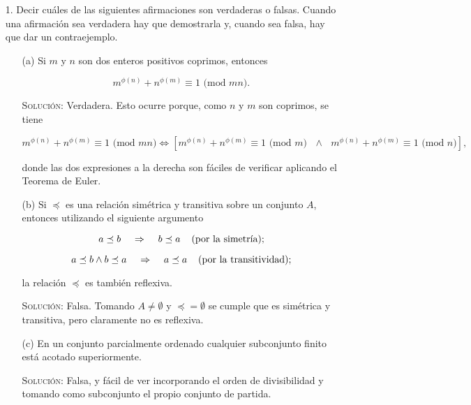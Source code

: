 \documentclass{article}
\begin{document}
\begin{enumerate}
    \item[1.] Decir cuáles de las siguientes afirmaciones son verdaderas o falsas. Cuando una afirmación sea verdadera hay que demostrarla y, cuando sea falsa, hay que dar un contraejemplo.

    \begin{enumerate}
        \item[(a)] Si $m$ y $n$ son dos enteros positivos coprimos, entonces

        \[m^{\phi(n)} + n^{\phi(m)} \equiv 1 \text{ (mod }mn).\]

        \textsc{Solución:} Verdadera. Esto ocurre porque, como $n$ y $m$ son coprimos, se tiene

        \[m^{\phi(n)} + n^{\phi(m)} \equiv 1 \text{ (mod }mn) \iff [m^{\phi(n)} + n^{\phi(m)} \equiv 1 \text{ (mod }m) \text{ } \land \text{ } m^{\phi(n)} + n^{\phi(m)} \equiv 1 \text{ (mod }n)],\]

        donde las dos expresiones a la derecha son fáciles de verificar aplicando el Teorema de Euler.

        \item[(b)] Si $\preceq$ es una relación simétrica y transitiva sobre un conjunto $A$, entonces utilizando el siguiente argumento 

        \[a \preceq b \hspace{0.4cm} \Rightarrow \hspace{0.4cm} b \preceq a \hspace{0.4cm} \text{(por la simetría);}\]

        \[a \preceq b \land b \preceq a \hspace{0.4cm} \Rightarrow \hspace{0.4cm} a \preceq a \hspace{0.4cm} \text{(por la transitividad);}\]

        la relación $\preceq$ es también reflexiva.

        \textsc{Solución:} Falsa. Tomando $A \neq \emptyset$ y $\preceq = \emptyset$ se cumple que es simétrica y transitiva, pero claramente no es reflexiva.

        \item[(c)] En un conjunto parcialmente ordenado cualquier subconjunto finito está acotado superiormente.

        \textsc{Solución:} Falsa, y fácil de ver incorporando el orden de divisibilidad y tomando como subconjunto el propio conjunto de partida.


\end{enumerate}
\end{enumerate}
\end{document}
